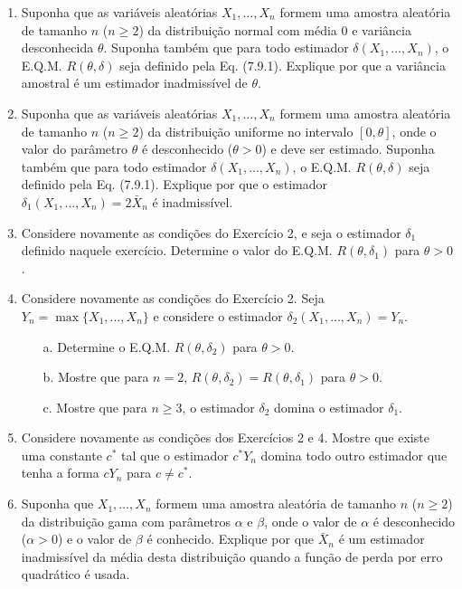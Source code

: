 \begin{enumerate}
    \item Suponha que as variáveis aleatórias $X_1, \dots, X_n$ formem uma amostra aleatória de tamanho $n$ ($n \ge 2$) da distribuição normal com média 0 e variância desconhecida $\theta$. Suponha também que para todo estimador $\delta(X_1, \dots, X_n)$, o E.Q.M. $R(\theta, \delta)$ seja definido pela Eq. (7.9.1). Explique por que a variância amostral é um estimador inadmissível de $\theta$.

    \item Suponha que as variáveis aleatórias $X_1, \dots, X_n$ formem uma amostra aleatória de tamanho $n$ ($n \ge 2$) da distribuição uniforme no intervalo $[0, \theta]$, onde o valor do parâmetro $\theta$ é desconhecido ($\theta > 0$) e deve ser estimado. Suponha também que para todo estimador $\delta(X_1, \dots, X_n)$, o E.Q.M. $R(\theta, \delta)$ seja definido pela Eq. (7.9.1). Explique por que o estimador $\delta_1(X_1, \dots, X_n) = 2\bar{X}_n$ é inadmissível.

    \item Considere novamente as condições do Exercício 2, e seja o estimador $\delta_1$ definido naquele exercício. Determine o valor do E.Q.M. $R(\theta, \delta_1)$ para $\theta > 0$.

    \item Considere novamente as condições do Exercício 2. Seja $Y_n = \max\{X_1, \dots, X_n\}$ e considere o estimador $\delta_2(X_1, \dots, X_n) = Y_n$.
    \begin{enumerate}
        \item[a.] Determine o E.Q.M. $R(\theta, \delta_2)$ para $\theta > 0$.
        \item[b.] Mostre que para $n=2$, $R(\theta, \delta_2) = R(\theta, \delta_1)$ para $\theta > 0$.
        \item[c.] Mostre que para $n \ge 3$, o estimador $\delta_2$ domina o estimador $\delta_1$.
    \end{enumerate}

    \item Considere novamente as condições dos Exercícios 2 e 4. Mostre que existe uma constante $c^*$ tal que o estimador $c^*Y_n$ domina todo outro estimador que tenha a forma $cY_n$ para $c \ne c^*$.

    \item Suponha que $X_1, \dots, X_n$ formem uma amostra aleatória de tamanho $n$ ($n \ge 2$) da distribuição gama com parâmetros $\alpha$ e $\beta$, onde o valor de $\alpha$ é desconhecido ($\alpha > 0$) e o valor de $\beta$ é conhecido. Explique por que $\bar{X}_n$ é um estimador inadmissível da média desta distribuição quando a função de perda por erro quadrático é usada.


\end{enumerate}
